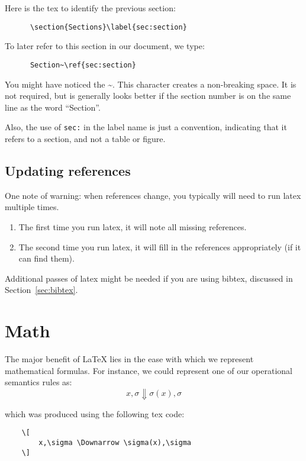 \documentclass{article}
\begin{document}
Here is the tex to identify the previous section:
\begin{verbatim}
      \section{Sections}\label{sec:section}
\end{verbatim}

To later refer to this section in our document, we type:
\begin{verbatim}
      Section~\ref{sec:section}
\end{verbatim}

\noindent
You might have noticed the \textasciitilde.
This character creates a non-breaking space.
It is not required, but is generally looks better if
the section number is on the same line as the word ``Section''.

Also, the use of {\tt sec:} in the label name is just a convention,
indicating that it refers to a section, and not a table or figure.

\subsection{Updating references}
One note of warning:
when references change, you typically will need to run latex multiple times.
\begin{enumerate}
  \item The first time you run latex, it will note all missing references.
  \item The second time you run latex, it will fill in the references appropriately (if it can find them).
\end{enumerate}

\noindent
Additional passes of latex might be needed if you are using bibtex,
discussed in Section~\ref{sec:bibtex}.

\section{Math}

The major benefit of LaTeX lies in the ease with which we represent mathematical formulas.
For instance, we could represent one of our operational semantics rules as:
\[
  x,\sigma \Downarrow \sigma(x),\sigma
\]

\noindent
which was produced using the following tex code:
\begin{verbatim}
    \[
        x,\sigma \Downarrow \sigma(x),\sigma
    \]
\end{verbatim}
\end{document}
